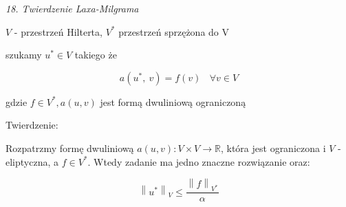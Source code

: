 \textit{18. Twierdzenie Laxa-Milgrama}

$V$ - przestrzeń Hilterta, $V^*$ przestrzeń sprzężona do V

szukamy $u^* \in V$ takiego że

\[a(u^*,\ v) = f(v)\ \ \ \ \forall v \in V\]

gdzie $f \in V^*, a(u,v)$ jest formą dwuliniową ograniczoną

Twierdzenie:

Rozpatrzmy formę dwuliniową $a(u, v): V \times V \rightarrow \mathbb{R}$, która jest ograniczona i $V$ -eliptyczna, a $f \in V^*$. Wtedy zadanie ma jedno znaczne rozwiązanie oraz:

\[ \left \| u^* \right \|_V \leqslant \frac{\left \| f \right \|_{V^*}} {\alpha} \]
